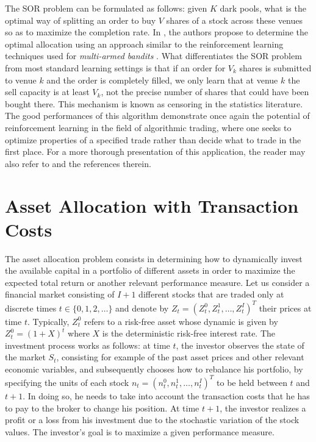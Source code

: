 The SOR problem can be formulated as follows: given $K$ dark pools, what is the optimal way of splitting an order to buy $V$ shares of a stock across these venues so as to maximize the completion rate. In \cite{ganchev2010censored}, the authors propose to determine the optimal allocation using an approach similar to the reinforcement learning techniques used for \emph{multi-armed bandits} \cite{gittins2011multi}. What differentiates the SOR problem from most standard learning settings is that if an order for $V_k$ shares is submitted to venue $k$ and the order is completely filled, we only learn that at venue $k$ the sell capacity is at least $V_k$, not the precise number of shares that could have been bought there. This mechanism is known as censoring in the statistics literature. The good performances of this algorithm demonstrate once again the potential of reinforcement learning in the field of algorithmic trading, where one seeks to optimize properties of a specified trade rather than decide what to trade in the first place. For a more thorough presentation of this application, the reader may also refer to \cite{kearns2013machine} and the references therein.

\section{Asset Allocation with Transaction Costs}
\label{sec:asset_allocation_with_transaction_costs}

The asset allocation problem consists in determining how to dynamically invest the available capital in a portfolio of different assets in order to maximize the expected total return or another relevant performance measure. Let us consider a financial market consisting of $I+1$ different stocks that are traded only at discrete times $t \in \{0, 1, 2, \ldots\}$ and denote by ${Z}_t = {(Z_t^0, Z_t^1, \ldots, Z_t^I)}^T$ their prices at time $t$. Typically, $Z_t^0$ refers to a risk-free asset whose dynamic is given by $Z_t^0 = {(1 + X)}^t$ where $X$ is the deterministic risk-free interest rate. The investment process works as follows: at time $t$, the investor observes the state of the market $S_t$, consisting for example of the past asset prices and other relevant economic variables, and subsequently chooses how to rebalance his portfolio, by specifying the units of each stock ${n}_t = {(n_t^0 , n_t^1 , \ldots , n_t^I)}^T$ to be held between $t$ and $t+1$. In doing so, he needs to take into account the transaction costs that he has to pay to the broker to change his position.  At time $t+1$, the investor realizes a profit or a loss from his investment due to the stochastic variation of the stock values. The investor's goal is to maximize a given performance measure.

